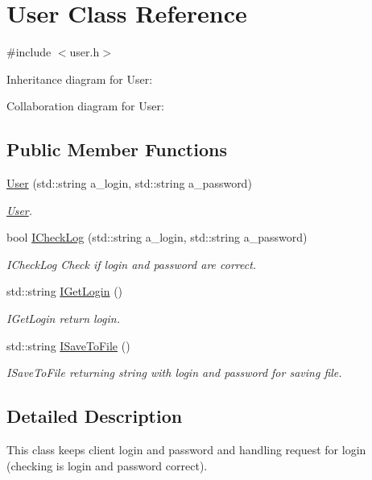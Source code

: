 \hypertarget{classUser}{}\section{User Class Reference}
\label{classUser}


{\ttfamily \#include $<$user.\+h$>$}



Inheritance diagram for User\+:


Collaboration diagram for User\+:
\subsection*{Public Member Functions}
\begin{DoxyCompactItemize}
\item 
\hyperlink{classUser_adf70eef5e6d21f9a84290dc4aa1d5f21}{User} (std\+::string a\+\_\+login, std\+::string a\+\_\+password)
\begin{DoxyCompactList}\small\item\em \hyperlink{classUser}{User}. \end{DoxyCompactList}\item 
bool \hyperlink{classUser_a1949b221d5b9142fc6b873ab1f5feed6}{I\+Check\+Log} (std\+::string a\+\_\+login, std\+::string a\+\_\+password)
\begin{DoxyCompactList}\small\item\em I\+Check\+Log Check if login and password are correct. \end{DoxyCompactList}\item 
std\+::string \hyperlink{classUser_ac12b18720e84b74d18f34c9c1981f6f6}{I\+Get\+Login} ()
\begin{DoxyCompactList}\small\item\em I\+Get\+Login return login. \end{DoxyCompactList}\item 
std\+::string \hyperlink{classUser_ab6265ead11a9f3beabe52f94691eb20a}{I\+Save\+To\+File} ()
\begin{DoxyCompactList}\small\item\em I\+Save\+To\+File returning string with login and password for saving file. \end{DoxyCompactList}\end{DoxyCompactItemize}


\subsection{Detailed Description}
This class keeps client login and password and handling request for login (checking is login and password correct). 

